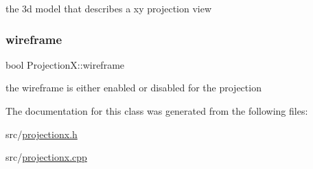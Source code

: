 the 3d model that describes a xy projection view 

\mbox{\label{class_projection_x_aa9a1f3880a2084eb87cbbe0f98c67a64}} 
\subsubsection{\texorpdfstring{wireframe}{wireframe}}
{\footnotesize\ttfamily bool Projection\+X\+::wireframe}



the wireframe is either enabled or disabled for the projection 



The documentation for this class was generated from the following files\+:\begin{DoxyCompactItemize}
\item 
src/\mbox{\hyperlink{projectionx_8h}{projectionx.\+h}}\item 
src/\mbox{\hyperlink{projectionx_8cpp}{projectionx.\+cpp}}\end{DoxyCompactItemize}
